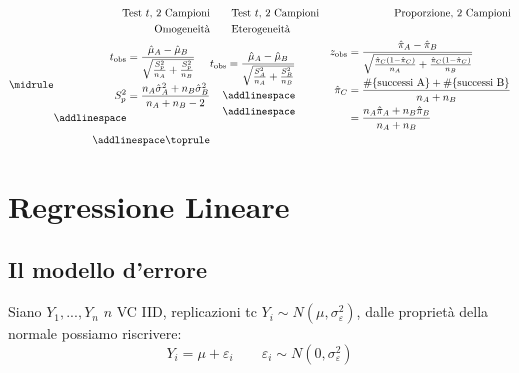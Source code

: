 \documentclass[
  11pt,
]{book}
\theoremstyle{mytheoremstyle}
\theoremstyle{mydefstyle}
\begin{document}
\begin{info2}

\begin{align*}
    \text{Test $t$, 2 Campioni} & 
    \text{\qquad Test $t$, 2 Campioni} & 
    \text{Proporzione, 2 Campioni} \\
    \text{Omogeneità} & 
    \text{\qquad Eterogeneità} & 
     \\
    \midrule
    \begin{aligned}
      t_{\text{obs}}&=\frac{\hat\mu_A-\hat\mu_B}{\sqrt{\frac{S_p^2}{n_A}+\frac{S_p^2}{n_B}}}\\
      S^2_p &= \frac{n_A\hat\sigma_A^2+n_B\hat\sigma_B^2}{n_A+n_B-2}\\
      \addlinespace \\
    \end{aligned} &
    \begin{aligned}
      \displaystyle t_{\text{obs}}=\frac{\hat\mu_A-\hat\mu_B}{\sqrt{\frac{S_A^2}{n_A}+\frac{S_B^2}{n_B}}}\\
      \addlinespace \\ \addlinespace \\ 
    \end{aligned} &
    \begin{aligned}
      z_{\text{obs}} &=\frac{\hat\pi_A-\hat\pi_B}{\sqrt{\frac{\hat\pi_C(1-\hat\pi_C)}{n_A}+\frac{\hat\pi_C(1-\hat\pi_C)}{n_B}}}\\
      \hat\pi_C &=\frac{\#\{\text{successi A}\}+\#\{\text{successi B}\}}{n_A+n_B}\\
                &=\frac{n_A\hat\pi_A+n_B\hat\pi_B}{n_A+n_B}
    \end{aligned} \\
    \addlinespace
    \toprule
\end{align*}

\end{info2}

\normalsize

\chapter{Regressione Lineare}\label{regressione-lineare}

\section{Il modello d'errore}\label{il-modello-derrore}

Siano \(Y_1,...,Y_n\) \(n\) VC IID, replicazioni tc \(Y_i\sim N(\mu,\sigma_\varepsilon^2)\), dalle proprietà della normale possiamo riscrivere:
\[Y_i=\mu+\varepsilon_i\qquad\varepsilon_i\sim N(0,\sigma_\varepsilon^2)\]
\end{document}
